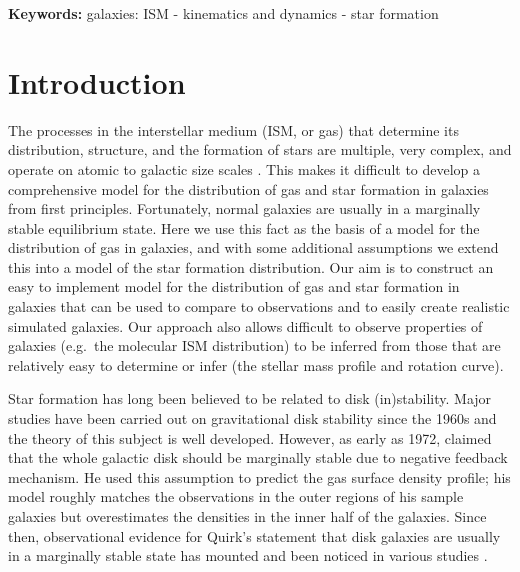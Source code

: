 \documentclass[12pt,preprint]{aastex}
\begin{document}
{\bf Keywords:} galaxies: ISM - kinematics and dynamics - star formation



\section{Introduction}
\label{introduction}

The processes in the interstellar medium (ISM, or gas) that determine its distribution, structure, and the formation of stars are multiple, very complex, and operate on atomic to galactic size scales \citep[see e.g.][]{mck07}.  This makes it difficult to develop a comprehensive model for the distribution of gas and star formation in galaxies from first principles.  Fortunately, normal galaxies are usually in a marginally stable equilibrium state.  Here we use this fact as the basis of a model for the distribution of gas in galaxies, and with some additional assumptions we extend this into a model of the star formation distribution. Our aim is to construct an easy to implement model for the distribution of gas and star formation in galaxies that can be used to compare to observations and to easily create realistic simulated galaxies.   Our approach also allows difficult to observe properties of galaxies (e.g.\ the molecular ISM distribution) to be inferred from those that are relatively easy to determine or infer (the stellar mass profile and rotation curve).


Star formation has long been believed to be related to disk (in)stability.
Major studies \citep[e.g.][]{too64,wan94,raf01,rom11,elm11} have been carried out on gravitational disk stability  since the 1960s and  the theory of this subject is well developed. 
However, as early as 1972, \citeauthor{qui72}  claimed that the whole galactic disk should be marginally stable due to negative feedback mechanism.  He  used this assumption to predict the gas surface density profile; his model roughly matches the observations in the outer regions of his sample galaxies but overestimates the densities in the inner half of the galaxies. 
Since then, observational evidence for Quirk's statement that disk galaxies are usually in a marginally stable state has mounted and been noticed in various studies \citep[e.g.][]{ken89, vdh93, ler08}. 
\end{document}
